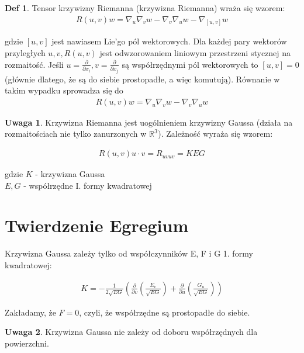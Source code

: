 \documentclass{article}
\theoremstyle{plain}
\theoremstyle{definition}
\newtheorem*{defi*}{Def}
\theoremstyle{definition}
\newtheorem*{not*}{Uwaga}
\begin{document}
\begin{defi*}
Tensor krzywizny Riemanna (krzywizna Riemanna) wraża się wzorem:
\begin{align*}
     R(u,v)w=\nabla _{u}\nabla _{v}w-\nabla _{v}\nabla _{u}w-\nabla _{[u,v]}w
\end{align*}

\noindent gdzie $[u, v]$ jest nawiasem Lie'go pól wektorowych. Dla każdej pary wektorów przyległych $u, v, R(u, v)$ jest odwzorowaniem liniowym przestrzeni stycznej na rozmaitość. Jeśli ${u = \frac{\partial}{\partial x_i}}, {v = \frac{\partial}{\partial x_j}}$ są współrzędnymi pól wektorowych to $[u, v] = 0$ (głównie dlatego, że są do siebie prostopadłe, a więc komutują). Równanie w takim wypadku sprowadza się do 
\begin{align*}
     R(u,v)w=\nabla _{u}\nabla _{v}w-\nabla _{v}\nabla _{u}w
\end{align*}

\begin{not*}
Krzywizna Riemanna jest uogólnieniem krzywizny Gaussa (działa na rozmaitościach nie tylko zanurzonych w $\mathbb{R^3}$). Zależność wyraża się wzorem:

\begin{align*}
    R(u, v)u \cdot v = R_{uvuv} = KEG
\end{align*}

\noindent gdzie $K$ - krzywizna Gaussa \\
$E, G$ - współrzędne I. formy kwadratowej

\end{not*}

\end{defi*}

\section{Twierdzenie Egregium}
Krzywizna Gaussa zależy tylko od współczynników E, F i G 1. formy kwadratowej:


\begin{align*}
    K = -\frac{1}{2\sqrt{EG}}\left( \frac{\partial}{\partial v} \left( \frac{E_v}{\sqrt{EG}} \right) + \frac{\partial}{\partial u} \left( \frac{G_u}{\sqrt{EG}}  \right)  \right)
\end{align*}

\noindent Zakładamy, że $F = 0$, czyli, że współrzędne są prostopadłe do siebie.

\begin{not*}
Krzywizna Gaussa nie zależy od doboru współrzędnych dla powierzchni. 
\end{not*}
\end{document}
